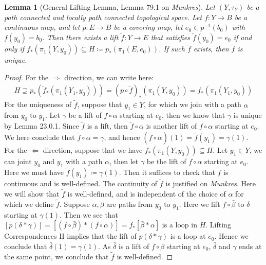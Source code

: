 \documentclass[11pt]{book}
\theoremstyle{break}
\theoremstyle{break}
\newtheorem{lem}{Lemma}[thm]
\newcommand{\that}[1]{\widetilde{#1}}
\begin{document}
\begin{lem}[General Lifting Lemma, Lemma 79.1 on \textit{Munkres}]
Let $(Y,\tau_Y)$ be a path connected and locally path connected topological space. Let $f:Y \to B$ be a continuous map, and let $p:E \to B$ be a covering map, let $e_0 \in p^{-1}(b_0)$ with $f(y_0) = b_0$. Then there exists a lift $\that{f} :Y \to E$ that satisfies $\that{f}(y_0) = e_0$ if and only if $f_*(\pi_1(Y,y_0)) \subseteq H \coloneqq p_*(\pi_1(E,e_0))$. If such $\that{f}$ exists, then $\that{f}$ is unique. 
\end{lem}
\begin{proof}
For the $\Rightarrow$ direction, we can write here:
\begin{align*}
H \supseteq p_*(\that{f}_*(\pi_1(Y_1,y_0))) = (p \circ \that{f})_* (\pi_1(Y,y_0)) = f_*(\pi_1(Y_1,y_0))
\end{align*}
For the uniqueness of $\that{f}$, suppose that $y_1 \in Y$, for which we join with a path $\alpha$ from $y_0$ to $y_1$. Let $\gamma$ be a lift of $f\circ \alpha$ starting at $e_0$, then we know that $\gamma$ is unique by Lemma 23.0.1. Since $\that{f}$ is a lift, then $\that{f} \circ \alpha$ is another lift of $f\circ \alpha$ starting at $e_0$. We here conclude that $\that{f} \circ \alpha = \gamma$, and hence $(\that{f} \circ \alpha)(1) = \that{f}(y_1) = \gamma(1)$. \\

For the $\Leftarrow$ direction, suppose that we have $f_*(\pi_1(Y,y_0)) \subseteq H$. Let $y_1 \in Y$, we can joint $y_0$ and $y_1$ with a path $\alpha$, then let $\gamma$ be the lift of $f\circ \alpha$ starting at $e_0$. Here we must have $\that{f}(y_1) \coloneqq \gamma(1)$. Then it suffices to check that $\that{f}$ is continuous and is well-defined. The continuity of $\that{f}$ is justified on \textit{Munkres}. Here we will show that $\that{f}$ is well-defined, and is independent of the choice of $\alpha$ for which we define $\that{f}$. Suppose $\alpha,\beta$ are paths from $y_0$ to $y_1$. Here we lift $f\circ \bar{\beta}$ to $\delta$ starting at $\gamma(1)$. Then we see that $[p(\delta*\gamma) ]= [(f\circ \bar{\beta})*(f\circ \alpha)] = f_*[\bar{\beta}*\alpha]$ is a loop in $H$. Lifting Correspondences II implies that the lift of $p(\delta*\gamma)$ is a loop at $e_0$. Hence we conclude that $\bar{\delta}(1) = \gamma(1)$. As $\bar{\delta}$ is a lift of $f\circ \beta$ starting at $e_0$, $\bar{\delta}$ and $\gamma$ ends at the same point, we conclude that $\that{f}$ is well-defined.
\end{proof}
\end{document}
